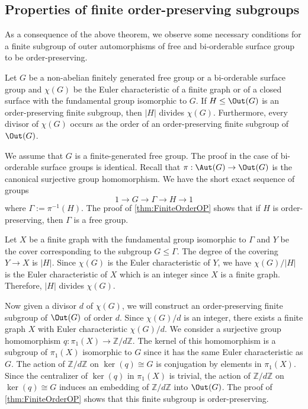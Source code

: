\documentclass{amsart}
\makeatletter
\renewenvironment{proof}[1][\proofname]{%
   \par\pushQED{\qed}\normalfont%
   \topsep6\p@\@plus6\p@\relax
   \trivlist\item[\hskip\labelsep\bfseries#1\@addpunct{.}]%
   \ignorespaces
}{%
   \popQED\endtrivlist\@endpefalse
}
\makeatother
\begin{document}
\subsection{Properties of finite order-preserving subgroups}
As a consequence of the above theorem, we observe some necessary conditions for a finite subgroup of outer automorphisms of free and bi-orderable surface group to be order-preserving. 

\begin{cor}
    Let $G$ be a non-abelian finitely generated free group or a bi-orderable surface group and $\chi(G)$ be the Euler characteristic of a finite graph or of a closed surface with the fundamental group isomorphic to $G$. If $H \leq \Out(G)$ is an order-preserving finite subgroup, then $|H|$ divides $\chi(G)$. Furthermore, every divisor of $\chi(G)$ occurs as the order of an order-preserving finite subgroup of $\Out(G)$.
\end{cor} 

\begin{proof}
    We assume that $G$ is a finite-generated free group. The proof in the case of bi-orderable surface groups is identical. Recall that $\pi:\Aut(G) \to \Out(G)$ is the canonical surjective group homomorphism. We have the short exact sequence of groups
    \[
    1 \to G \to \Gamma \to H \to 1
    \]
    where $\Gamma := \pi^{-1}(H)$. The proof of \cref{thm:FiniteOrderOP} shows that if $H$ is order-preserving, then $\Gamma$ is a free group. 
    
    Let $X$ be a finite graph with the fundamental group isomorphic to $\Gamma$ and $Y$ be the cover corresponding to the subgroup $G \leq \Gamma$. The degree of the covering $Y \to X$ is $|H|$. Since $\chi(G)$ is the Euler characteristic of $Y$, we have $\chi(G)/|H|$ is the Euler characteristic of $X$ which is an integer since $X$ is a finite graph. Therefore, $|H|$ divides $\chi(G)$. 

    Now given a divisor $d$ of $\chi(G)$, we will construct an order-preserving finite subgroup of $\Out(G)$ of order $d$. Since $\chi(G)/d$ is an integer, there exists a finite graph $X$ with Euler characteristic $\chi(G)/d$. We consider a surjective group homomorphism $q:\pi_1(X) \to \mathbb{Z}/d\mathbb{Z}$. The kernel of this homomorphism is a subgroup of $\pi_1(X)$ isomorphic to $G$ since it has the same Euler characteristic as $G$. The action of $\mathbb{Z}/d\mathbb{Z}$ on $\ker(q) \cong G$ is conjugation by elements in $\pi_1(X)$. Since the centralizer of $\ker(q)$ in $\pi_1(X)$ is trivial, the action of $\mathbb{Z}/d\mathbb{Z}$ on $\ker(q) \cong G$ induces an embedding of $\mathbb{Z}/d\mathbb{Z}$ into $\Out(G)$. The proof of \cref{thm:FiniteOrderOP} shows that this finite subgroup is order-preserving.        
\end{proof}
\end{document}
